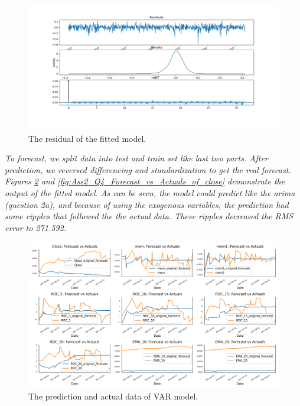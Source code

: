 \begin{figure}[H]
    \centering
    \begin{minipage}[b]{1\textwidth}
        \includegraphics[width=\textwidth]{manuscript/src/figures/Ass2/Ass2_Q4_residual_plot.png}
    \end{minipage}
    \caption{The residual of the fitted model.}
    \label{fig:Ass2_Q4_residual_plot}
\end{figure}

\textit{To forecast, we split data into test and train set like last two parts. After prediction, we reversed differencing and standardization to get the real forecast. Figures \ref{fig:Ass2_Q4_Forecast_vs_Actuals} and \ref{fig:Ass2_Q4_Forecast_vs_Actuals_of_close} demonstrate the output of the fitted model. As can be seen, the model could predict like the \gls{arima} (question 2a), and because of using the exogenous variables, the prediction had some ripples that followed the the actual data. These ripples decreased the RMS error to 271.592.} 

\begin{figure}[H]
    \centering
    \begin{minipage}[b]{1\textwidth}
        \includegraphics[width=\textwidth]{manuscript/src/figures/Ass2/Ass2_Q4_Forecast_vs_Actuals.png}
    \end{minipage}
    \caption{The prediction and actual data of VAR model.}
    \label{fig:Ass2_Q4_Forecast_vs_Actuals}
\end{figure}


